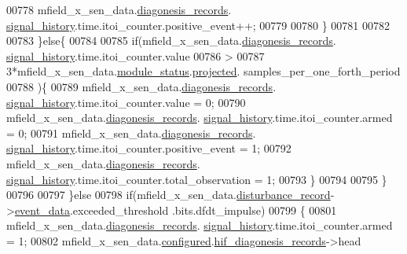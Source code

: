 \begin{DoxyCode}
00778                           mfield\_x\_sen\_data.\hyperlink{a00025_a2bd79ce84bbd6b7f50d38954f7ae475e}{diagonesis\_records}.
      \hyperlink{a00019_ab7038f4de1f77b52a7f89e9f77c0b846}{signal\_history}.time.itoi\_counter.positive\_event++;
00779 
00780                          \}
00781 
00782 
00783                  \}\textcolor{keywordflow}{else}\{
00784 
00785                     \textcolor{keywordflow}{if}(mfield\_x\_sen\_data.\hyperlink{a00025_a2bd79ce84bbd6b7f50d38954f7ae475e}{diagonesis\_records}.
      \hyperlink{a00019_ab7038f4de1f77b52a7f89e9f77c0b846}{signal\_history}.time.itoi\_counter.value
00786                     >
00787                     3*mfield\_x\_sen\_data.\hyperlink{a00025_adfab5a5d8b45a93dfb13edb24e2b80e3}{module\_status}.\hyperlink{a00019_af2267fb093fb5dcaa006a570a6da3b6b}{projected}.
      samples\_per\_one\_forth\_period
00788                     )\{
00789                        mfield\_x\_sen\_data.\hyperlink{a00025_a2bd79ce84bbd6b7f50d38954f7ae475e}{diagonesis\_records}.
      \hyperlink{a00019_ab7038f4de1f77b52a7f89e9f77c0b846}{signal\_history}.time.itoi\_counter.value = 0;
00790                        mfield\_x\_sen\_data.\hyperlink{a00025_a2bd79ce84bbd6b7f50d38954f7ae475e}{diagonesis\_records}.
      \hyperlink{a00019_ab7038f4de1f77b52a7f89e9f77c0b846}{signal\_history}.time.itoi\_counter.armed = 0;
00791                        mfield\_x\_sen\_data.\hyperlink{a00025_a2bd79ce84bbd6b7f50d38954f7ae475e}{diagonesis\_records}.
      \hyperlink{a00019_ab7038f4de1f77b52a7f89e9f77c0b846}{signal\_history}.time.itoi\_counter.positive\_event = 1;
00792                        mfield\_x\_sen\_data.\hyperlink{a00025_a2bd79ce84bbd6b7f50d38954f7ae475e}{diagonesis\_records}.
      \hyperlink{a00019_ab7038f4de1f77b52a7f89e9f77c0b846}{signal\_history}.time.itoi\_counter.total\_observation = 1;
00793                      \}
00794 
00795                  \}
00796 
00797          \}\textcolor{keywordflow}{else}
00798          \textcolor{keywordflow}{if}(mfield\_x\_sen\_data.\hyperlink{a00025_ac9b38e2c1d3f1013a88d33506c754152}{disturbance\_record}->\hyperlink{a00028_a8c0bda69e71ef674e60da47ad0be9ab0}{event\_data}.exceeded\_threshold
      .bits.dfdt\_impulse)
00799          \{
00801                  mfield\_x\_sen\_data.\hyperlink{a00025_a2bd79ce84bbd6b7f50d38954f7ae475e}{diagonesis\_records}.
      \hyperlink{a00019_ab7038f4de1f77b52a7f89e9f77c0b846}{signal\_history}.time.itoi\_counter.armed              = 1;
00802                  mfield\_x\_sen\_data.\hyperlink{a00025_a94b2d1f6ea4ab334c74d24984dd27843}{configured}.\hyperlink{a00021_ae18294f7499d9fcb5ec796a1816b8cd8}{hif\_diagonesis\_records}->head 

\end{DoxyCode}
